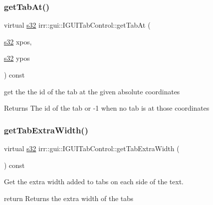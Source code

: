 \subsubsection{\texorpdfstring{get\+Tab\+At()}{getTabAt()}}
{\footnotesize\ttfamily virtual \hyperlink{namespaceirr_ac66849b7a6ed16e30ebede579f9b47c6}{s32} irr\+::gui\+::\+I\+G\+U\+I\+Tab\+Control\+::get\+Tab\+At (\begin{DoxyParamCaption}\item[{\hyperlink{namespaceirr_ac66849b7a6ed16e30ebede579f9b47c6}{s32}}]{xpos,  }\item[{\hyperlink{namespaceirr_ac66849b7a6ed16e30ebede579f9b47c6}{s32}}]{ypos }\end{DoxyParamCaption}) const\hspace{0.3cm}{\ttfamily [pure virtual]}}



get the the id of the tab at the given absolute coordinates 

\begin{DoxyReturn}{Returns}
The id of the tab or -\/1 when no tab is at those coordinates 
\end{DoxyReturn}
\mbox{\label{classirr_1_1gui_1_1IGUITabControl_afaeab7a998a34ab5e8398930276ab3bd}} 
\subsubsection{\texorpdfstring{get\+Tab\+Extra\+Width()}{getTabExtraWidth()}}
{\footnotesize\ttfamily virtual \hyperlink{namespaceirr_ac66849b7a6ed16e30ebede579f9b47c6}{s32} irr\+::gui\+::\+I\+G\+U\+I\+Tab\+Control\+::get\+Tab\+Extra\+Width (\begin{DoxyParamCaption}{ }\end{DoxyParamCaption}) const\hspace{0.3cm}{\ttfamily [pure virtual]}}



Get the extra width added to tabs on each side of the text. 

return Returns the extra width of the tabs \mbox{\label{classirr_1_1gui_1_1IGUITabControl_aff6b4e0bd1a4b641fd0e3c73a0500d72}} 
